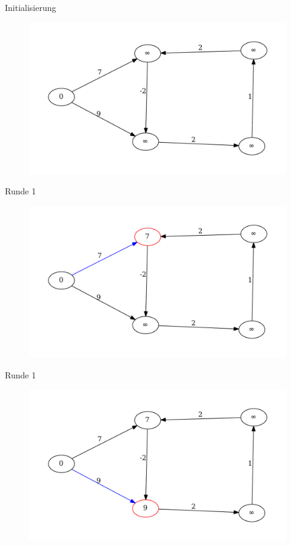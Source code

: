 \begin{frame}{Initialisierung}
\begin{figure}[htbp]
\centering
\includegraphics[width=\linewidth]{bellman_ford_graphs/graph_00.pdf}
\end{figure}
\end{frame}

\begin{frame}{Runde 1}
\begin{figure}[htbp]
\centering
\includegraphics[width=\linewidth]{bellman_ford_graphs/graph_01.pdf}
\end{figure}
\end{frame}


\begin{frame}{Runde 1}
\begin{figure}[htbp]
\centering
\includegraphics[width=\linewidth]{bellman_ford_graphs/graph_02.pdf}
\end{figure}
\end{frame}

